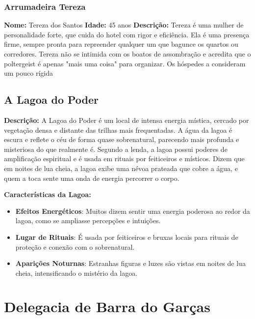 \begin{personagem}  
\subsubsection{Arrumadeira Tereza}

\textbf{Nome:} Tereza dos Santos  
\textbf{Idade:} 45 anos  
\textbf{Descrição:}  
Tereza é uma mulher de personalidade forte, que cuida do hotel com rigor e eficiência. Ela é uma presença firme, sempre pronta para repreender qualquer um que bagunce os quartos ou corredores. Tereza não se intimida com os boatos de assombração e acredita que o poltergeist é apenas "mais uma coisa" para organizar. Os hóspedes a consideram um pouco rígida
\end{personagem}


\subsection{A Lagoa do Poder}

\textbf{Descrição:}  
A Lagoa do Poder é um local de intensa energia mística, cercado por vegetação densa e distante das trilhas mais frequentadas. A água da lagoa é escura e reflete o céu de forma quase sobrenatural, parecendo mais profunda e misteriosa do que realmente é. Segundo a lenda, a lagoa possui poderes de amplificação espiritual e é usada em rituais por feiticeiros e místicos. Dizem que em noites de lua cheia, a lagoa exibe uma névoa prateada que cobre a água, e quem a toca sente uma onda de energia percorrer o corpo.

\textbf{Características da Lagoa:}  
\begin{itemize}
    \item \textbf{Efeitos Energéticos}: Muitos dizem sentir uma energia poderosa ao redor da lagoa, como se ampliasse percepções e intuições.
    \item \textbf{Lugar de Rituais}: É usada por feiticeiros e bruxas locais para rituais de proteção e conexão com o sobrenatural.
    \item \textbf{Aparições Noturnas}: Estranhas figuras e luzes são vistas em noites de lua cheia, intensificando o mistério da lagoa.
\end{itemize}

\section{Delegacia de Barra do Garças}


